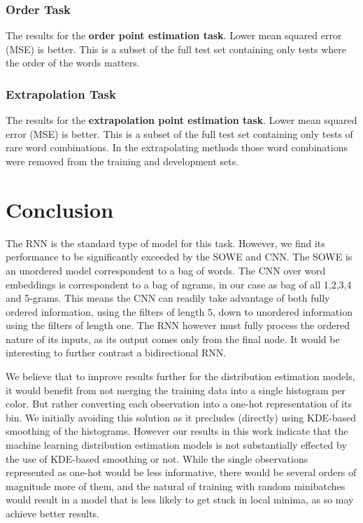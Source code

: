 \documentclass[11pt,a4paper]{article}
\begin{document}
\subsubsection{Order Task}

\begin{table}
	\caption{\label{tbl:pointord} The results for the \textbf{order point estimation task}. Lower mean squared error (MSE) is better. This is a subset of the full test set containing only tests where the order of the words matters.}
\end{table}

\subsubsection{Extrapolation Task}
\begin{table}
	\caption{\label{tbl:pointextrapo} The results for the \textbf{extrapolation point estimation task}. Lower mean squared error (MSE) is better. This is a subset of the full test set containing only tests of rare word combinations. In the extrapolating methods those word combinations were removed from the training and development sets.}
\end{table}




\section{Conclusion}

The RNN is the standard type of model for this task.
However, we find its performance to be significantly exceeded by the SOWE and CNN.
The SOWE is an unordered model correspondent to a bag of words.
The CNN over word embeddings is correspondent to a bag of ngrams, in our case as bag of all 1,2,3,4 and 5-grams.
This means the CNN can readily take advantage of both fully ordered information, using the filters of length 5, down to unordered information using the filters of length one.
The RNN however must fully process the ordered nature of its inputs, as its output comes only from the final node.
It would be interesting to further contrast a bidirectional RNN.


We believe that to improve results further for the distribution estimation models,
it would benefit from not merging the training data into a single histogram per color.
But rather converting each observation into a one-hot representation of its bin.
We initially avoiding this solution as it precludes (directly) using KDE-based smoothing of the histograms.
However our results in this work indicate that the machine learning distribution estimation models is not substantially effected by the use of KDE-based smoothing or not.
While the single observations represented as one-hot would be less informative, there would be several orders of magnitude more of them, and the natural of training with random minibatches would result in a model that is less likely to get stuck in local minima, as so may achieve better results.


\clearpage


\clearpage
\appendix

\end{document}
